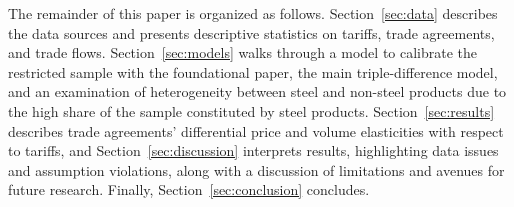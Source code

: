 The remainder of this paper is organized as follows. Section~\ref{sec:data} describes the data sources and presents descriptive statistics on tariffs, trade agreements, and trade flows. Section~\ref{sec:models} walks through a model to calibrate the restricted sample with the foundational paper, the main triple-difference model, and an examination of heterogeneity between steel and non-steel products due to the high share of the sample constituted by steel products. Section~\ref{sec:results} describes trade agreements' differential price and volume elasticities with respect to tariffs, and Section~\ref{sec:discussion} interprets results, highlighting data issues and assumption violations, along with a discussion of limitations and avenues for future research. Finally, Section~\ref{sec:conclusion} concludes. 

